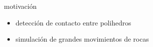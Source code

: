  
\begin{frame}{motivación}
\begin{itemize}
  \item detección de contacto entre polihedros
  \item simulación de grandes movimientos de rocas  
\end{itemize}
\end{frame}
